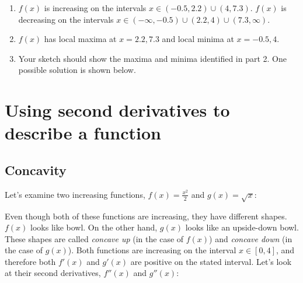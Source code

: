 \begin{Answer}
\begin{enumerate}
	\item $f(x)$ is increasing on the intervals $x\in (-0.5, 2.2)\cup(4, 7.3)$. $f(x)$ is decreasing on the intervals $x\in (-\infty, -0.5)\cup(2.2, 4)\cup(7.3, \infty)$. 
	\item $f(x)$ has local maxima at $x = 2.2, 7.3$ and local minima at $x=-0.5, 4$. 
	\item Your sketch should show the maxima and minima identified in part 2. One possible solution is shown below.
\end{enumerate}
\end{Answer}	

\section{Using second derivatives to describe a function}
\subsection{Concavity}
Let's examine two increasing functions, $f(x) = \frac{x^2}{2}$ and $g(x) = \sqrt{x}$:
\begin{figure}
\centering
{}
\end{figure}

Even though both of these functions are increasing, they have different shapes. $f(x)$ looks like bowl. On the other hand, $g(x)$ looks like an upside-down bowl. These shapes are called \textit{concave up} (in the case of $f(x)$) and \textit{concave down} (in the case of $g(x)$). Both functions are increasing on the interval $x \in [0, 4]$, and therefore both $f'(x)$ and $g'(x)$ are positive on the stated interval. Let's look at their second derivatives, $f''(x)$ and $g''(x)$:

